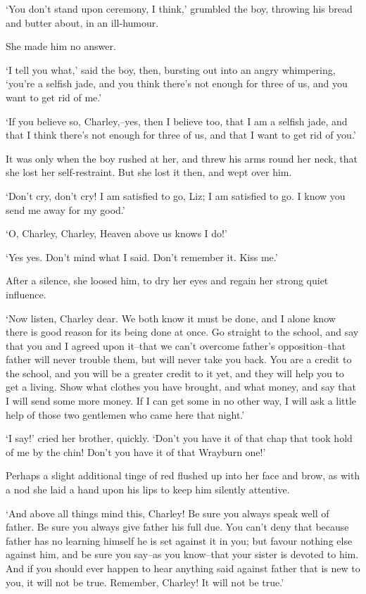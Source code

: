 ‘You don’t stand upon ceremony, I think,’ grumbled the boy, throwing his
bread and butter about, in an ill-humour.

She made him no answer.

‘I tell you what,’ said the boy, then, bursting out into an angry
whimpering, ‘you’re a selfish jade, and you think there’s not enough for
three of us, and you want to get rid of me.’

‘If you believe so, Charley,--yes, then I believe too, that I am a
selfish jade, and that I think there’s not enough for three of us, and
that I want to get rid of you.’

It was only when the boy rushed at her, and threw his arms round her
neck, that she lost her self-restraint. But she lost it then, and wept
over him.

‘Don’t cry, don’t cry! I am satisfied to go, Liz; I am satisfied to go.
I know you send me away for my good.’

‘O, Charley, Charley, Heaven above us knows I do!’

‘Yes yes. Don’t mind what I said. Don’t remember it. Kiss me.’

After a silence, she loosed him, to dry her eyes and regain her strong
quiet influence.

‘Now listen, Charley dear. We both know it must be done, and I alone
know there is good reason for its being done at once. Go straight to the
school, and say that you and I agreed upon it--that we can’t overcome
father’s opposition--that father will never trouble them, but will never
take you back. You are a credit to the school, and you will be a greater
credit to it yet, and they will help you to get a living. Show what
clothes you have brought, and what money, and say that I will send some
more money. If I can get some in no other way, I will ask a little help
of those two gentlemen who came here that night.’

‘I say!’ cried her brother, quickly. ‘Don’t you have it of that chap
that took hold of me by the chin! Don’t you have it of that Wrayburn
one!’

Perhaps a slight additional tinge of red flushed up into her face and
brow, as with a nod she laid a hand upon his lips to keep him silently
attentive.

‘And above all things mind this, Charley! Be sure you always speak well
of father. Be sure you always give father his full due. You can’t deny
that because father has no learning himself he is set against it in
you; but favour nothing else against him, and be sure you say--as you
know--that your sister is devoted to him. And if you should ever happen
to hear anything said against father that is new to you, it will not be
true. Remember, Charley! It will not be true.’

